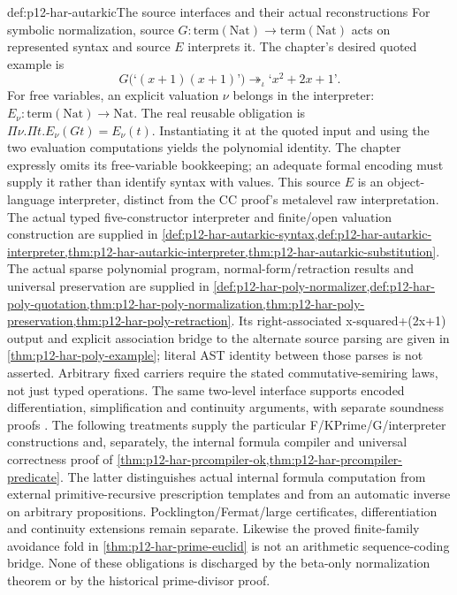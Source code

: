 \begin{hbdefinition}{def:p12-har-autarkic}{The source interfaces and their actual reconstructions}
For symbolic normalization, source \(G:\mathrm{term}(\mathrm{Nat})
\to\mathrm{term}(\mathrm{Nat})\) acts on represented syntax and
source \(E\) interprets it. The chapter's desired quoted example is
\[
 G\bigl(\text{`}(x+1)(x+1)\text{'}\bigr)
       \twoheadrightarrow_\iota
       \text{`}x^2+2x+1\text{'}.
\]
For free variables, an explicit valuation \(\nu\) belongs in the
interpreter: \(E_\nu:\mathrm{term}(\mathrm{Nat})\to\mathrm{Nat}\).
The real reusable obligation is
\(\Pi\nu.\Pi t.E_\nu(Gt)=E_\nu(t)\). Instantiating it
at the quoted input and using the two evaluation computations yields
the polynomial identity. The chapter expressly omits its free-variable
bookkeeping; an adequate formal encoding must supply it rather than
identify syntax with values. This source \(E\) is an object-language
interpreter, distinct from the CC proof's metalevel raw interpretation.
The actual typed five-constructor interpreter and finite/open valuation
construction are supplied in
\cref{def:p12-har-autarkic-syntax,def:p12-har-autarkic-interpreter,thm:p12-har-autarkic-interpreter,thm:p12-har-autarkic-substitution}.
The actual sparse polynomial program, normal-form/retraction results and
universal preservation are supplied in
\cref{def:p12-har-poly-normalizer,def:p12-har-poly-quotation,thm:p12-har-poly-normalization,thm:p12-har-poly-preservation,thm:p12-har-poly-retraction}.
Its right-associated x-squared+(2x+1) output and explicit association
bridge to the alternate source parsing are given in
\cref{thm:p12-har-poly-example}; literal AST identity between those
parses is not asserted. Arbitrary fixed carriers require the stated
commutative-semiring laws, not just typed operations.
The same two-level interface supports encoded differentiation,
simplification and continuity arguments, with separate soundness proofs
\cite[pp.~1220--1223]{BarendregtGeuvers2001}.
The following treatments supply the particular F/KPrime/G/interpreter
constructions and, separately, the internal formula compiler and universal
correctness proof of
\cref{thm:p12-har-prcompiler-ok,thm:p12-har-prcompiler-predicate}.
The latter distinguishes actual internal formula computation from external
primitive-recursive prescription templates and from an automatic inverse
on arbitrary propositions. Pocklington/Fermat/large certificates,
differentiation and continuity extensions remain separate. Likewise the proved finite-family avoidance fold in
\cref{thm:p12-har-prime-euclid} is not an arithmetic sequence-coding
bridge. None of these obligations is discharged by the beta-only
normalization theorem or by the historical prime-divisor proof.
\end{hbdefinition}

